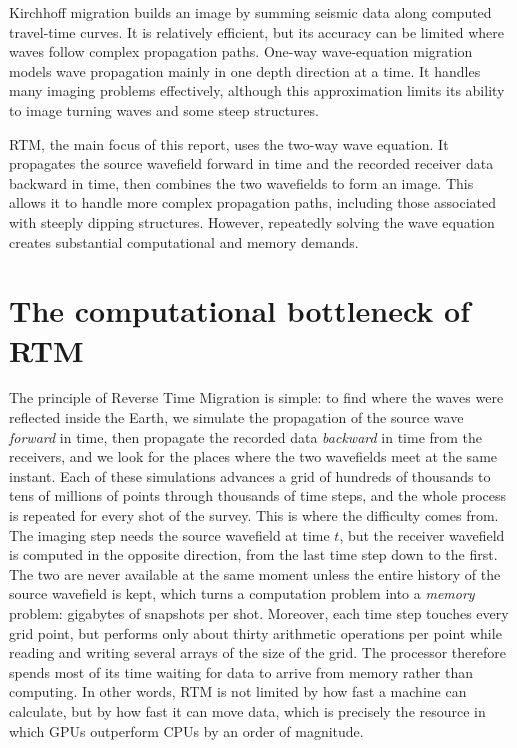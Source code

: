 \documentclass[letterpaper,11pt,leqno]{article}
\begin{document}
Kirchhoff migration builds an image by summing seismic data along computed travel-time curves. It is relatively efficient, but its accuracy can be limited where waves follow complex propagation paths. One-way wave-equation migration models wave propagation mainly in one depth direction at a time. It handles many imaging problems effectively, although this approximation limits its ability to image turning waves and some steep structures.

RTM, the main focus of this report, uses the two-way wave equation. It propagates the source wavefield forward in time and the recorded receiver data backward in time, then combines the two wavefields to form an image. This allows it to handle more complex propagation paths, including those associated with steeply dipping structures. However, repeatedly solving the wave equation creates substantial computational and memory demands.




\section{The computational bottleneck of RTM}\label{s:computation bottleneck}

The principle of Reverse Time Migration is simple: to find where the waves were
reflected inside the Earth, we simulate the propagation of the source wave
\emph{forward} in time, then propagate the recorded data \emph{backward} in time
from the receivers, and we look for the places where the two wavefields meet at
the same instant. Each of these simulations advances a grid of hundreds of
thousands to tens of millions of points through thousands of time steps, and the
whole process is repeated for every shot of the survey. This is where the
difficulty comes from. The imaging step needs the source wavefield at time $t$,
but the receiver wavefield is computed in the opposite direction, from the last
time step down to the first. The two are never available at the same moment
unless the entire history of the source wavefield is kept, which turns a
computation problem into a \emph{memory} problem: gigabytes of snapshots per shot.
Moreover, each time step touches every grid point, but performs only about thirty
arithmetic operations per point while reading and writing several arrays of the
size of the grid. The processor therefore spends most of its time waiting for
data to arrive from memory rather than computing. In other words, RTM is not
limited by how fast a machine can calculate, but by how fast it can move data,
which is precisely the resource in which GPUs outperform CPUs by an order of
magnitude.
\end{document}
